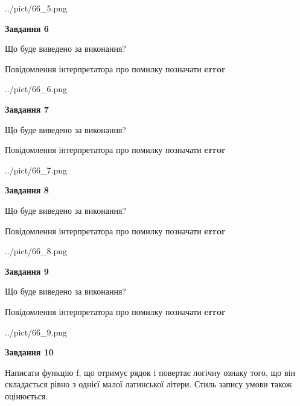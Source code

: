 \documentclass[12pt, ukrainian]{article}
\begin{document}
{\begin {large}
\begin{center}
	{../pict/66_5.png}
\end{center}
\newpage

{\begin {center}\textbf{Завдання 6}\end {center}}\par
Що буде виведено за виконання? \par
Повідомлення інтерпретатора про помилку позначати \textbf{error}

\begin{center}
	{../pict/66_6.png}
\end{center}
\newpage

{\begin {center}\textbf{Завдання 7}\end {center}}\par
Що буде виведено за виконання? \par
Повідомлення інтерпретатора про помилку позначати \textbf{error}

\begin{center}
	{../pict/66_7.png}
\end{center}
\newpage

{\begin {center}\textbf{Завдання 8}\end {center}}\par
Що буде виведено за виконання? \par
Повідомлення інтерпретатора про помилку позначати \textbf{error}

\begin{center}
	{../pict/66_8.png}
\end{center}
\newpage

{\begin {center}\textbf{Завдання 9}\end {center}}\par
Що буде виведено за виконання? \par
Повідомлення інтерпретатора про помилку позначати \textbf{error}

\begin{center}
	{../pict/66_9.png}
\end{center}
\newpage

{\begin {center}\textbf{Завдання 10}\end {center}}\par

Написати функцiю f, що отримує рядок i повертає логічну ознаку того, що вiн складається рівно з однієї малої латинської літери. Стиль запису умови також оцінюється.\par
\newpage

\end {large}}
\end{document}
